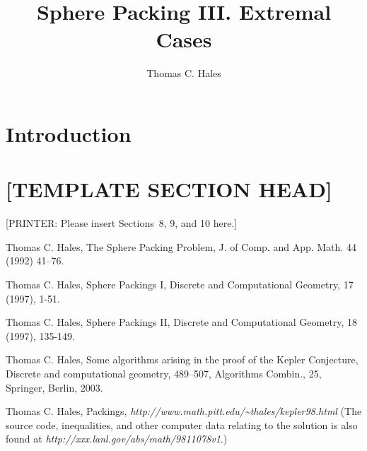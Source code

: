 \documentclass[11pt]{amsart}
\title{Sphere Packing III. Extremal Cases}
\author{Thomas C. Hales}
\begin{document}
\begin{abstract}

\end{abstract}

\maketitle

\section*{Introduction}



\section*{[TEMPLATE SECTION HEAD]}

[PRINTER: Please insert Sections~8, 9, and 10 here.]






\begin{thebibliography}{Hal97b}

 Thomas C. Hales, The Sphere Packing Problem, J. of Comp.
and App. Math. 44 (1992) 41--76.

 Thomas C. Hales, Sphere Packings I,
    Discrete and Computational Geometry, 17 (1997), 1-51.

 Thomas C. Hales, Sphere Packings II,
    Discrete and Computational Geometry, 18 (1997), 135-149.

 Thomas C. Hales, Some algorithms arising in
the proof of the Kepler Conjecture,
 Discrete and computational geometry,
 489--507, Algorithms Combin., 25, Springer, Berlin, 2003.

 Thomas C. Hales, Packings, \hfill\break
    \hfill{\it http://www.math.pitt.edu/\~%
    \relax thales/kepler98.html} \hfil\break
     (The source code, inequalities,
    and other computer data relating to the solution is also found
    at {\it http://xxx.lanl.gov/abs/math/9811078v1}.)






\end{thebibliography}
\end{document}
